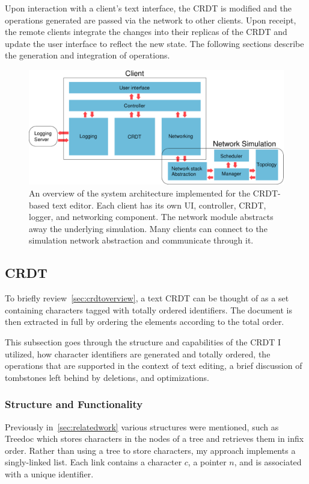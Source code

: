 \documentclass[12pt,a4paper,twoside,openright]{report}
\begin{document}
	Upon interaction with a client's text interface, the CRDT is modified and the operations generated are passed via the network to other clients. Upon receipt, the remote clients integrate the changes into their replicas of the CRDT and update the user interface to reflect the new state. The following sections describe the generation and integration of operations.
	
	\begin{figure}[H]
		\centering
		\includegraphics[width=1\linewidth]{figs/sysarch.eps}
		\caption[System Architecture]{An overview of the system architecture implemented for the CRDT-based text editor. Each client has its own UI, controller, CRDT, logger, and networking component. The network module abstracts away the underlying simulation. Many clients can connect to the simulation network abstraction and communicate through it.}
		\label{fig:sysarch}
	\end{figure}
	
	
	\subsection{CRDT}
		To briefly review~\cref{sec:crdtoverview}, a text CRDT can be thought of as a set containing characters tagged with totally ordered identifiers. The document is then extracted in full by ordering the elements according to the total order. 
		
		This subsection goes through the structure and capabilities of the CRDT I utilized, how character identifiers are generated and totally ordered, the operations that are supported in the context of text editing, a brief discussion of tombstones left behind by deletions, and optimizations.
		
		\subsubsection{Structure and Functionality} \label{sec:crdtstructure}
		Previously in~\cref{sec:relatedwork} various structures were mentioned, such as Treedoc which stores characters in the nodes of a tree and retrieves them in infix order. Rather than using a tree to store characters, my approach implements a singly-linked list. Each link contains a character $c$, a pointer $n$, and is associated with a unique identifier.
		
\end{document}
